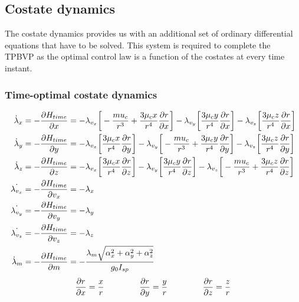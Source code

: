 \subsection{Costate dynamics}
The costate dynamics provides us with an additional set of ordinary differential equations that have to be solved. This system is required to complete the TPBVP as the optimal control law is a function of the costates at every time instant.
\subsubsection{Time-optimal costate dynamics}
\begin{align}
	\dot{\lambda}_x&=-\frac{\partial \boldmath{H_{time}}}{\partial x}=-\lambda_{v_x}\bigg[-\frac{mu_c}{r^3}+\frac{3\mu_c x}{r^4}\frac{\partial r}{\partial x}\bigg]-\lambda_{v_y}\bigg[\frac{3\mu_c y}{r^4}\frac{\partial r}{\partial x}\bigg]-\lambda_{v_z}\bigg[\frac{3\mu_c z}{r^4}\frac{\partial r}{\partial x}\bigg]\\
	\dot{\lambda}_y&=-\frac{\partial \boldmath{H_{time}}}{\partial y}=-\lambda_{v_x}\bigg[\frac{3\mu_c x}{r^4}\frac{\partial r}{\partial y}\bigg]-\lambda_{v_y}\bigg[-\frac{mu_c}{r^3}+\frac{3\mu_c y}{r^4}\frac{\partial r}{\partial y}\bigg]-\lambda_{v_z}\bigg[\frac{3\mu_c z}{r^4}\frac{\partial r}{\partial y}\bigg]\\
	\dot{\lambda}_z&=-\frac{\partial \boldmath{H_{time}}}{\partial z}=-\lambda_{v_x}\bigg[\frac{3\mu_c x}{r^4}\frac{\partial r}{\partial z}\bigg]-\lambda_{v_y}\bigg[\frac{3\mu_c y}{r^4}\frac{\partial r}{\partial z}\bigg]-\lambda_{v_z}\bigg[-\frac{mu_c}{r^3}+\frac{3\mu_c z}{r^4}\frac{\partial r}{\partial z}\bigg]\\
	\dot{\lambda_{v_x}}&=-\frac{\partial \boldmath{H_{time}}}{\partial v_x}=-\lambda_x\\
	\dot{\lambda_{v_y}}&=-\frac{\partial \boldmath{H_{time}}}{\partial v_y}=-\lambda_y\\
	\dot{\lambda_{v_z}}&=-\frac{\partial \boldmath{H_{time}}}{\partial v_z}=-\lambda_z\\
	\dot{\lambda}_m&=-\frac{\partial \boldmath{H_{time}}}{\partial m}=-\frac{\lambda_m\sqrt{\alpha_x^2+\alpha_y^2+\alpha_z^2}}{g_0 I_{sp}}
\end{align}
\begin{align}
	\frac{\partial r}{\partial x}=\frac{x}{r}\hspace{15mm}
	\frac{\partial r}{\partial y}=\frac{y}{r}\hspace{15mm}
	\frac{\partial r}{\partial z}=\frac{z}{r}
\end{align}
